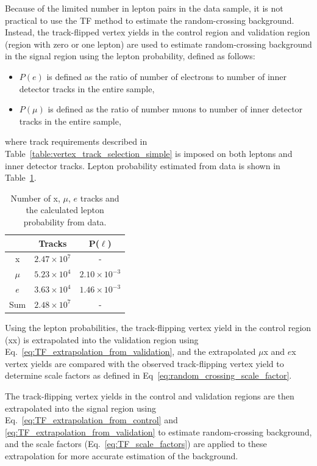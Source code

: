 Because of the limited number in lepton pairs in the data sample, it is not practical to use the TF method to estimate the random-crossing background. Instead, the track-flipped vertex yields in the control region and validation region (region with zero or one lepton) are used to estimate random-crossing background in the signal region using the lepton probability, defined as follows:
\begin{itemize}
\item $P(e)$ is defined as the ratio of number of electrons to number of inner detector tracks in the entire sample,
\item $P(\mu)$ is defined as the ratio of number muons to number of inner detector tracks in the entire sample,
\end{itemize}
where track requirements described in Table~\ref{table:vertex_track_selection_simple} is imposed on both leptons and inner detector tracks. Lepton probability estimated from data is shown in Table~\ref{table:lepton_probability}.

\begin{table}[!htb]%
  \centering
    \begin{tabular}[t]{ccc}
        \hline\hline
                & Tracks             & P($\ell$)           \\
         \hline
         x      & $2.47\times10^{7}$ & -                   \\
         $\mu$  & $5.23\times10^{4}$ & $2.10\times10^{-3}$ \\
         $e$    & $3.63\times10^{4}$ & $1.46\times10^{-3}$ \\
         Sum    & $2.48\times10^{7}$ & - \\
        \hline\hline
    \end{tabular}
  \caption{Number of x, $\mu$, $e$ tracks and the calculated lepton probability from data.}%
  \label{table:lepton_probability}
\end{table}


Using the lepton probabilities, the track-flipping vertex yield in the control region (xx) is extrapolated into the validation region using Eq.~\ref{eq:TF_extrapolation_from_validation}, and the extrapolated $\mu$x and $e$x vertex yields are compared with the observed track-flipping vertex yield to determine scale factors as defined in Eq~\ref{eq:random_crossing_scale_factor}.

The track-flipping vertex yields in the control and validation regions are then extrapolated into the signal region using Eq.~\ref{eq:TF_extrapolation_from_control} and \ref{eq:TF_extrapolation_from_validation} to estimate random-crossing background, and the scale factors (Eq.~\ref{eq:TF_scale_factors}) are applied to these extrapolation for more accurate estimation of the background.



